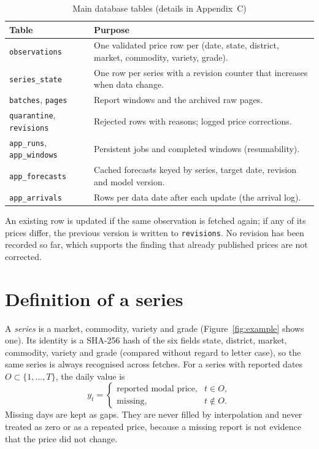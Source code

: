 \documentclass[12pt,a4paper,oneside]{report}
\numberwithin{equation}{chapter}
\numberwithin{figure}{chapter}
\numberwithin{table}{chapter}
\theoremstyle{definition}
\begin{document}
\begin{table}[H]
\centering
\caption{Main database tables (details in Appendix~C)}
\label{tab:tables}
\small
\begin{tabular}{@{}p{}p{}@{}}
\toprule
Table & Purpose \\
\midrule
\texttt{observations} & One validated price row per (date, state, district, market, commodity, variety, grade). \\
\texttt{series\_state} & One row per series with a revision counter that increases when data change. \\
\texttt{batches}, \texttt{pages} & Report windows and the archived raw pages. \\
\texttt{quarantine}, \texttt{revisions} & Rejected rows with reasons; logged price corrections. \\
\texttt{app\_runs}, \texttt{app\_windows} & Persistent jobs and completed windows (resumability). \\
\texttt{app\_forecasts} & Cached forecasts keyed by series, target date, revision and model version. \\
\texttt{app\_arrivals} & Rows per data date after each update (the arrival log). \\
\bottomrule
\end{tabular}
\end{table}

An existing row is updated if the same observation is fetched again; if any of its prices differ, the previous version is written to \texttt{revisions}. No revision has been recorded so far, which supports the finding that already published prices are not corrected.

\section{Definition of a series}
A \emph{series} is a market, commodity, variety and grade (Figure~\ref{fig:example} shows one). Its identity is a SHA-256 hash of the six fields state, district, market, commodity, variety and grade (compared without regard to letter case), so the same series is always recognised across fetches. For a series with reported dates $O\subset\{1,\dots,T\}$, the daily value is
\[
  y_t=\begin{cases}\text{reported modal price}, & t\in O,\\ \text{missing}, & t\notin O.\end{cases}
\]
Missing days are kept as gaps. They are never filled by interpolation and never treated as zero or as a repeated price, because a missing report is not evidence that the price did not change.
\end{document}
